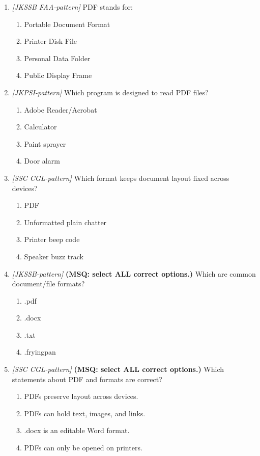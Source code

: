 \documentclass[11pt]{article}
\begin{document}
\begin{enumerate}[label=\textbf{Q\arabic*.}, leftmargin=*]
\item \textit{[JKSSB FAA-pattern]} PDF stands for:
  \begin{enumerate}[label=\Alph*.]
    \item Portable Document Format
    \item Printer Disk File
    \item Personal Data Folder
    \item Public Display Frame
  \end{enumerate}
\item \textit{[JKPSI-pattern]} Which program is designed to read PDF files?
  \begin{enumerate}[label=\Alph*.]
    \item Adobe Reader/Acrobat
    \item Calculator
    \item Paint sprayer
    \item Door alarm
  \end{enumerate}
\item \textit{[SSC CGL-pattern]} Which format keeps document layout fixed across devices?
  \begin{enumerate}[label=\Alph*.]
    \item PDF
    \item Unformatted plain chatter
    \item Printer beep code
    \item Speaker buzz track
  \end{enumerate}
\item \textit{[JKSSB-pattern]} \textbf{(MSQ: select ALL correct options.)} Which are common document/file formats?
  \begin{enumerate}[label=\Alph*.]
    \item .pdf
    \item .docx
    \item .txt
    \item .fryingpan
  \end{enumerate}
\item \textit{[SSC CGL-pattern]} \textbf{(MSQ: select ALL correct options.)} Which statements about PDF and formats are correct?
  \begin{enumerate}[label=\Alph*.]
    \item PDFs preserve layout across devices.
    \item PDFs can hold text, images, and links.
    \item .docx is an editable Word format.
    \item PDFs can only be opened on printers.
  \end{enumerate}
\end{enumerate}
\def\JKSSBLessonID{33}\def\JKSSBAnswers{0}
\end{document}
